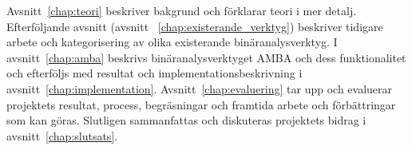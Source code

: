 Avsnitt~\ref{chap:teori} beskriver bakgrund och förklarar teori i mer detalj.
Efterföljande avsnitt (avsnitt ~\ref{chap:existerande_verktyg}) beskriver
tidigare arbete och kategorisering av olika existerande binäranalysverktyg. I
avsnitt~\ref{chap:amba} beskrivs binäranalysverktyget AMBA och dess
funktionalitet och efterföljs med resultat och implementationsbeskrivning i
avsnitt~\ref{chap:implementation}. Avsnitt~\ref{chap:evaluering} tar upp och
evaluerar projektets resultat, process, begräsningar och framtida arbete och
förbättringar som kan göras. Slutligen sammanfattas och diskuteras projektets
bidrag i avsnitt~\ref{chap:slutsats}.

